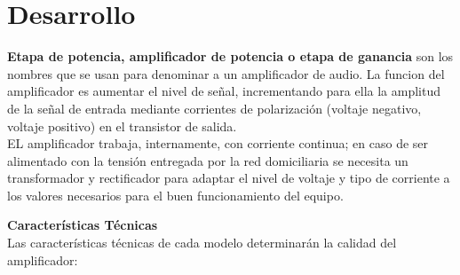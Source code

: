 \documentclass[11pt,a4paper]{article}
\begin{document}
\newpage

\section{Desarrollo}

\begin{flushleft}
\textbf{Etapa de potencia, amplificador de potencia o etapa de ganancia} son los nombres que se usan para denominar a un amplificador de audio. La funcion del amplificador es aumentar el nivel de señal, incrementando para ella la amplitud de la señal de entrada mediante corrientes de polarización (voltaje negativo, voltaje positivo) en el transistor de salida.\\

EL amplificador trabaja, internamente, con corriente continua; en caso de ser alimentado con la tensión entregada por la red domiciliaria se necesita un transformador y rectificador para adaptar el nivel de voltaje y tipo de corriente a los valores necesarios para el buen funcionamiento del equipo.\\
\end{flushleft}

\textbf{Características Técnicas}\\

Las características técnicas de cada modelo determinarán la calidad del amplificador:\\
\end{document}
